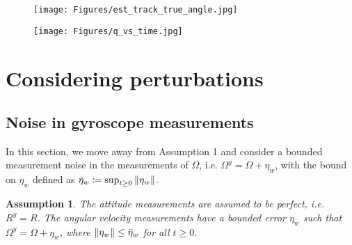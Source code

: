 \documentclass{article}
\newtheorem{assumption}{Assumption}
\newcommand{\etabound}{\Bar{\eta}_w}
\begin{document}
\begin{figure}[!h]
\begin{minipage}{.49\textwidth}
  \texttt{[image: Figures/est\_track\_true\_angle.jpg]}
  \label{fig:tracking}
\end{minipage}
\begin{minipage}{.49\textwidth}
  \texttt{[image: Figures/q\_vs\_time.jpg]}
  \label{fig:q_vs_time}
\end{minipage}
\end{figure}


\section{Considering perturbations}

\subsection{Noise in gyroscope measurements}
In this section, we move away from Assumption 1 and consider a bounded measurement noise in the measurements of $\Omega$, i.e. $\Omega^y = \Omega + \eta_w$, with the bound on $\eta_w$ defined as $\etabound \coloneqq \sup_{t\geq 0}\|\eta_w\|$.

\begin{assumption} \label{ass:assumption2}
    The attitude measurements are assumed to be perfect, i.e. $R^y = R$. The angular velocity measurements have a bounded error $ \eta_w$ such that $\Omega^y = \Omega + \eta_w$, where $\|\eta_w\|\leq \etabound$ for all $t\geq 0$.
\end{assumption}
\end{document}
